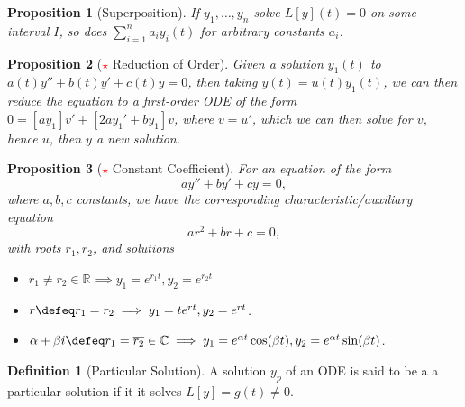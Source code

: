 \documentclass[12pt, oneside]{article}
\theoremstyle{definition}
\newtheorem{defn}{Definition}
\theoremstyle{plain}
\newtheorem{prop}{Proposition}
\theoremstyle{remark}
\begin{document}
\begin{prop}[Superposition]
  If $y_1, \dots, y_n$ solve $L[y](t) = 0$ on some interval $I$, so does $\sum_{i=1}^n a_i y_i(t)$ for arbitrary constants $a_i$.
\end{prop}

\begin{prop}[\textcolor{red}{$\star$} Reduction of Order]
  Given a solution $y_1(t)$ to $a(t) y'' + b(t) y' + c(t) y = 0$, then taking $y(t) = u(t) y_1(t)$, we can then reduce the equation to a first-order ODE of the form $0 = [ay_1]v' + [2ay_1' + by_1]v$, where $v = u'$, which we can then solve for $v$, hence $u$, then $y$ a new solution.
\end{prop}

\begin{prop}[\textcolor{red}{$\star$} Constant Coefficient]
  For an equation of the form \[
  ay'' + by' + cy = 0,  
  \]
  where $a, b, c$ constants, we have the corresponding characteristic/auxiliary equation \[
  ar^2 + br + c = 0,  
  \]
  with roots $r_1, r_2$, and solutions \begin{itemize}
    \item $r_1 \neq r_2 \in \mathbb{R} \implies y_1 = e^{r_1 t}, y_2 = e^{r_2 t}$
    \item $r \defeq r_1 = r_2 \implies y_1 = te^{r t}, y_2 = e^{rt}$.
    \item $\alpha + \beta i \defeq r_1 = \overline{r_2} \in \mathbb{C} \implies y_1 = e^{\alpha t} \cos (\beta t), y_2 = e^{\alpha t} \sin (\beta t)$.
  \end{itemize}
\end{prop}

\begin{defn}[Particular Solution]
A solution $y_p$ of an ODE is said to be a a particular solution if it it solves $L[y] = g(t) \neq 0$.
\end{defn}
\end{document}
